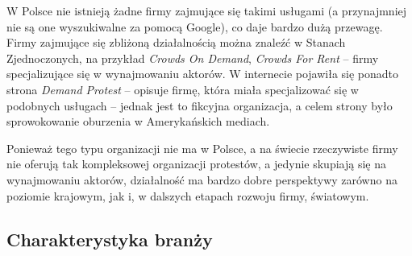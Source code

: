 \documentclass{article}
\begin{document}
W Polsce nie istnieją żadne firmy zajmujące się takimi usługami (a przynajmniej nie są one wyszukiwalne za pomocą Google), co daje bardzo dużą przewagę. Firmy zajmujące się zbliżoną działalnością można znaleźć w Stanach Zjednoczonych, na przykład \textit{Crowds On Demand}, \textit{Crowds For Rent} -- firmy specjalizujące się w wynajmowaniu aktorów. W internecie pojawiła się ponadto strona \textit{Demand Protest} -- opisuje firmę, która miała specjalizować się w podobnych usługach -- jednak jest to fikcyjna organizacja, a celem strony było sprowokowanie oburzenia w Amerykańskich mediach. 

Ponieważ tego typu organizacji nie ma w Polsce, a na świecie rzeczywiste firmy nie oferują tak kompleksowej organizacji protestów, a jedynie skupiają się na wynajmowaniu aktorów, działalność ma bardzo dobre perspektywy zarówno na poziomie krajowym, jak i, w dalszych etapach rozwoju firmy, światowym. 

\subsection{Charakterystyka branży}
\end{document}

